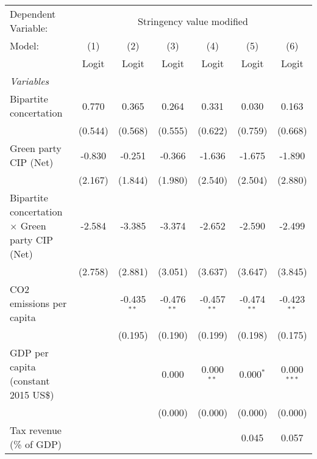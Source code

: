 
\begingroup
\centering
\begin{tabular}{lcccccc}
   \toprule
   Dependent Variable: & \multicolumn{6}{c}{Stringency value modified}\\
   Model:                                                 & (1)     & (2)           & (3)           & (4)           & (5)           & (6)\\  
                                                          &  Logit  & Logit         & Logit         & Logit         & Logit         & Logit\\  
   \midrule
   \emph{Variables}\\
   Bipartite concertation                                 & 0.770   & 0.365         & 0.264         & 0.331         & 0.030         & 0.163\\   
                                                          & (0.544) & (0.568)       & (0.555)       & (0.622)       & (0.759)       & (0.668)\\   
   Green party CIP (Net)                                  & -0.830  & -0.251        & -0.366        & -1.636        & -1.675        & -1.890\\   
                                                          & (2.167) & (1.844)       & (1.980)       & (2.540)       & (2.504)       & (2.880)\\   
   Bipartite concertation $\times$ Green party CIP (Net)  & -2.584  & -3.385        & -3.374        & -2.652        & -2.590        & -2.499\\   
                                                          & (2.758) & (2.881)       & (3.051)       & (3.637)       & (3.647)       & (3.845)\\   
   CO2 emissions per capita                               &         & -0.435$^{**}$ & -0.476$^{**}$ & -0.457$^{**}$ & -0.474$^{**}$ & -0.423$^{**}$\\   
                                                          &         & (0.195)       & (0.190)       & (0.199)       & (0.198)       & (0.175)\\   
   GDP per capita (constant 2015 US\$)                    &         &               & 0.000         & 0.000$^{**}$  & 0.000$^{*}$   & 0.000$^{***}$\\   
                                                          &         &               & (0.000)       & (0.000)       & (0.000)       & (0.000)\\   
   Tax revenue (\% of GDP)                                &         &               &               &               & 0.045         & 0.057\\   

\end{tabular}
